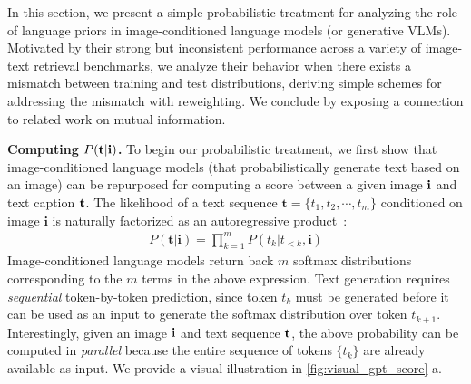 \documentclass{article} \usepackage{iclr2024_conference,times}
\begin{document}
In this section, we present a simple probabilistic treatment for analyzing the role of language priors in image-conditioned language models (or generative VLMs). Motivated by their strong but inconsistent performance across a variety of image-text retrieval benchmarks, we analyze their behavior when there exists a mismatch between training and test distributions, deriving simple schemes for addressing the mismatch with reweighting. We conclude by exposing a connection to related work on mutual information.





{\bf Computing $P(\mathbf{t}|{\bf i})$.} To begin our probabilistic treatment, we first show that image-conditioned language models (that probabilistically generate text based on an image) can be repurposed for computing a score between a given image ${\bf i}$ and text caption ${\bf t}$. The likelihood of a text sequence ${\mathbf t} = \{t_1, t_2, \cdots, t_m\}$ conditioned on image ${\mathbf i}$ is naturally factorized as an autoregressive product~\citep{bengio2003neural}:
\begin{align}
    P(\mathbf{t} | \mathbf{i}) = \prod_{k=1}^m P(t_k | t_{<k}, \mathbf{i})
\label{eq:product_of_conditionals}
\end{align}
Image-conditioned language models return back $m$ softmax distributions corresponding to the $m$ terms in the above expression. Text generation requires {\em sequential} token-by-token prediction, since token $t_k$ must be generated before it can be used as an input to generate the softmax distribution over token $t_{k+1}$. Interestingly, given an image ${\bf i}$ and text sequence ${\bf t}$, the above probability can be computed in {\em parallel} because the entire sequence of tokens $\{t_k\}$ are already available as input. We provide a visual illustration in \autoref{fig:visual_gpt_score}-a.
\end{document}
